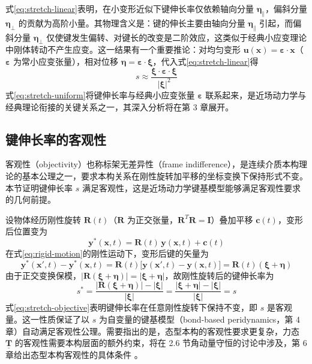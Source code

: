 式\eqref{eq:stretch-linear}表明，在小变形近似下键伸长率仅依赖轴向分量 $\boldsymbol{\eta}_{\parallel}$，偏斜分量 $\boldsymbol{\eta}_{\perp}$ 的贡献为高阶小量。其物理含义是：键的伸长主要由轴向分量 $\boldsymbol{\eta}_{\parallel}$ 引起，而偏斜分量 $\boldsymbol{\eta}_{\perp}$ 仅使键发生偏转、对键长的改变是二阶效应，这类似于经典小应变理论中刚体转动不产生应变。这一结果有一个重要推论：对均匀变形 $\mathbf{u}(\mathbf{x})=\boldsymbol{\varepsilon}\cdot\mathbf{x}$（$\boldsymbol{\varepsilon}$ 为常小应变张量），相对位移 $\boldsymbol{\eta}=\boldsymbol{\varepsilon}\cdot\boldsymbol{\xi}$，代入式\eqref{eq:stretch-linear}得
\begin{equation}
  s\approx\frac{\boldsymbol{\xi}\cdot\boldsymbol{\varepsilon}\cdot\boldsymbol{\xi}}{|\boldsymbol{\xi}|^{2}}
  \label{eq:stretch-uniform}
\end{equation}
式\eqref{eq:stretch-uniform}将键伸长率与经典小应变张量 $\boldsymbol{\varepsilon}$ 联系起来，是近场动力学与经典理论衔接的关键关系之一，其深入分析将在第 3 章展开。

\subsection{键伸长率的客观性}

客观性（objectivity）也称标架无差异性（frame indifference），是连续介质本构理论的基本公理之一，要求本构关系在刚性旋转加平移的坐标变换下保持形式不变。本节证明键伸长率 $s$ 满足客观性，这是近场动力学键基模型能够满足客观性要求的几何前提。

设物体经历刚性旋转 $\mathbf{R}(t)$（$\mathbf{R}$ 为正交张量，$\mathbf{R}^{T}\mathbf{R}=\mathbf{I}$）叠加平移 $\mathbf{c}(t)$，变形后位置变为
\begin{equation}
  \mathbf{y}^{*}(\mathbf{x},t)=\mathbf{R}(t)\,\mathbf{y}(\mathbf{x},t)+\mathbf{c}(t)
  \label{eq:rigid-motion}
\end{equation}
在式\eqref{eq:rigid-motion}的刚性运动下，变形后键的矢量为
\[
  \mathbf{y}^{*}(\mathbf{x}',t)-\mathbf{y}^{*}(\mathbf{x},t)=\mathbf{R}(t)\bigl[\mathbf{y}(\mathbf{x}',t)-\mathbf{y}(\mathbf{x},t)\bigr]=\mathbf{R}(t)(\boldsymbol{\xi}+\boldsymbol{\eta})
\]
由于正交变换保模，$|\mathbf{R}(\boldsymbol{\xi}+\boldsymbol{\eta})|=|\boldsymbol{\xi}+\boldsymbol{\eta}|$，故刚性旋转后的键伸长率为
\begin{equation}
  s^{*}=\frac{|\mathbf{R}(\boldsymbol{\xi}+\boldsymbol{\eta})|-|\boldsymbol{\xi}|}{|\boldsymbol{\xi}|}=\frac{|\boldsymbol{\xi}+\boldsymbol{\eta}|-|\boldsymbol{\xi}|}{|\boldsymbol{\xi}|}=s
  \label{eq:stretch-objective}
\end{equation}
式\eqref{eq:stretch-objective}表明键伸长率在任意刚性旋转下保持不变，即 $s$ 是客观量。这一性质保证了以 $s$ 为自变量的键基模型（bond-based peridynamics，第 4 章）自动满足客观性公理。需要指出的是，态型本构的客观性要求更复杂，力态 $\underline{\mathbf{T}}$ 的客观性需要本构层面的额外约束，将在 2.6 节角动量守恒的讨论中涉及，第 6 章给出态型本构客观性的具体条件 \cite{Silling2007,LeBobaru2018Obj}。

